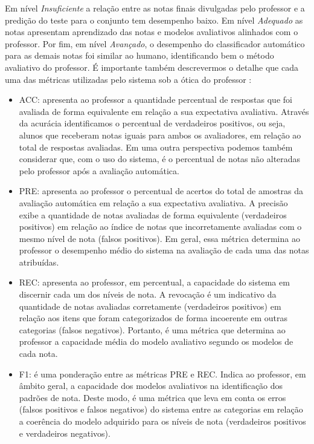 \begin{minipage}[!h]{0.45\textwidth}
Em nível \textit{Insuficiente} a relação entre as notas finais divulgadas pelo professor e a predição do teste para o conjunto tem desempenho baixo. Em nível \textit{Adequado} as notas apresentam aprendizado das notas e modelos avaliativos alinhados com o professor. Por fim, em nível \textit{Avançado}, o desempenho do classificador automático para as demais notas foi similar ao humano, identificando bem o método avaliativo do professor. É importante também descrevermos o detalhe que cada uma das métricas utilizadas pelo sistema sob a ótica do professor \cite{nascimento2020}:

\begin{itemize}
	\item ACC: apresenta ao professor a quantidade percentual de respostas que foi avaliada de forma equivalente em relação a sua expectativa avaliativa. Através da acurácia identificamos o percentual de verdadeiros positivos, ou seja, alunos que receberam notas iguais para ambos os avaliadores, em relação ao total de respostas avaliadas. Em uma outra perspectiva podemos também considerar que, com o uso do sistema, é o percentual de notas não alteradas pelo professor após a avaliação automática.

	\item PRE: apresenta ao professor o percentual de acertos do total de amostras da avaliação automática em relação a sua expectativa avaliativa. A precisão exibe a quantidade de notas avaliadas de forma equivalente (verdadeiros positivos) em relação ao índice de notas que incorretamente avaliadas com o mesmo nível de nota (falsos positivos). Em geral, essa métrica determina ao professor o desempenho médio do sistema na avaliação de cada uma das notas atribuídas.

	\item REC: apresenta ao professor, em percentual, a capacidade do sistema em discernir cada um dos níveis de nota. A revocação é um indicativo da quantidade de notas avaliadas corretamente (verdadeiros positivos) em relação aos itens que foram categorizados de forma incoerente em outras categorias (falsos negativos). Portanto, é uma métrica que determina ao professor a capacidade média do modelo avaliativo segundo os modelos de cada nota.


	\item F1: é uma ponderação entre as métricas PRE e REC. Indica ao professor, em âmbito geral, a capacidade dos modelos avaliativos na identificação dos padrões de nota. Deste modo, é uma métrica que leva em conta os erros (falsos positivos e falsos negativos) do sistema entre as categorias em relação a coerência do modelo adquirido para os níveis de nota (verdadeiros positivos e verdadeiros negativos).


\end{itemize}
\end{minipage}
